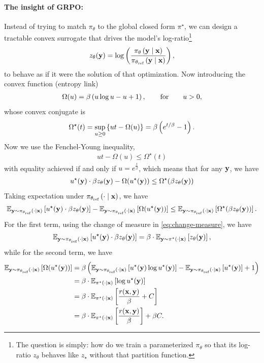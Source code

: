 \documentclass[11pt]{article}  %
\begin{document}
\paragraph{The insight of GRPO:}
Instead of trying to match $\pi_{\theta}$ to the global closed form $\pi^\star$, we can design a tractable convex surrogate that drives the model's log-ratio\footnote{The question is simply: how do we train a parameterized $\pi_\theta$ so that its log-ratio $z_{\theta}$ behaves like $z_\star$ without that partition function.} 
\begin{align*}
  z_{\theta}(\mathbf{y}) = \log \left( \frac{\pi_{\theta}\left( \mathbf{y} \mid \mathbf{x} \right)}{\pi_{\theta_{\text{ref}}}\left( \mathbf{y} \mid \mathbf{x} \right)} \right),
\end{align*}
to behave as if it were the solution of that optimization.
Now introducing the convex function (entropy link) 
\begin{align*}
  \Omega(u) = \beta\left( u \log u - u + 1 \right), \qquad \text{for} \qquad u > 0,
\end{align*}
whose convex conjugate is 
\begin{align*}
  \Omega^\star(t) = \sup_{u \geq 0}\left\{ ut - \Omega(u) \right\} = \beta \left( e^{t/\beta} - 1 \right).
\end{align*}
Now we use the Fenchel-Young inequality, 
\begin{align*}
  ut - \Omega(u) \leq \Omega^\star(t)
\end{align*}
with equality achieved if and only if $u = e^{\frac{t}{\beta}}$, which means that for any $\mathbf{y}$, we have 
\begin{align*}
  u^\star(\mathbf{y})\cdot\beta z_{\theta}(\mathbf{y}) - \Omega(u^\star(\mathbf{y})) \leq \Omega^\star(\beta z_{\theta}(\mathbf{y}))
\end{align*}
Taking expectation under $\pi_{\theta_{\text{ref}}}\left( \cdot \mid \mathbf{x} \right)$, we have 
\begin{align}
  \label{eq:org-1}
  \mathbb{E}_{\mathbf{y} \sim \pi_{\theta_{\text{ref}}}\left( \cdot \mid \mathbf{x} \right)}\left[u^\star(\mathbf{y})\cdot\beta z_{\theta}(\mathbf{y})\right] - \mathbb{E}_{\mathbf{y} \sim \pi_{\theta_{\text{ref}}}\left( \cdot \mid \mathbf{x} \right)}\left[\Omega(u^\star(\mathbf{y}))\right] \leq \mathbb{E}_{\mathbf{y} \sim \pi_{\theta_{\text{ref}}}\left( \cdot \mid \mathbf{x} \right)}\left[\Omega^\star(\beta z_{\theta}(\mathbf{y}))\right].
\end{align}
For the first term, using the change of measure in \eqref{eq:change-measure}, we have
\begin{align*}
  \mathbb{E}_{\mathbf{y} \sim \pi_{\theta_{\text{ref}}}\left( \cdot \mid \mathbf{x} \right)}\left[u^\star(\mathbf{y})\cdot\beta z_{\theta}(\mathbf{y})\right] = \beta \cdot \mathbb{E}_{\mathbf{y} \sim \pi^\star(\cdot \mid \mathbf{x})}\left[z_{\theta}(\mathbf{y})\right],
\end{align*}
while for the second term, we have
\begin{align*}
  \mathbb{E}_{\mathbf{y} \sim \pi_{\theta_{\text{ref}}}\left( \cdot \mid \mathbf{x} \right)}\left[\Omega(u^\star(\mathbf{y}))\right] &= \beta \left( \mathbb{E}_{\mathbf{y} \sim \pi_{\theta_{\text{ref}}}\left( \cdot \mid \mathbf{x} \right)}\left[u^\star(\mathbf{y})\log u^\star(\mathbf{y})\right] - \mathbb{E}_{\mathbf{y} \sim \pi_{\theta_{\text{ref}}}\left( \cdot \mid \mathbf{x} \right)}\left[u^\star(\mathbf{y})\right] + 1 \right) \\
  &= \beta\cdot\mathbb{E}_{\pi^\star(\cdot\mid \mathbf{x})}\left[\log u^\star(\mathbf{y})\right] \\
  &= \beta\cdot \mathbb{E}_{\pi^\star(\cdot\mid \mathbf{x})}\left[\frac{r(\mathbf{x}, \mathbf{y})}{\beta} +  C\right] \\
  &= \beta\cdot \mathbb{E}_{\pi^\star(\cdot\mid \mathbf{x})}\left[\frac{r(\mathbf{x}, \mathbf{y})}{\beta}\right] + \beta C.
\end{align*}
\end{document}
